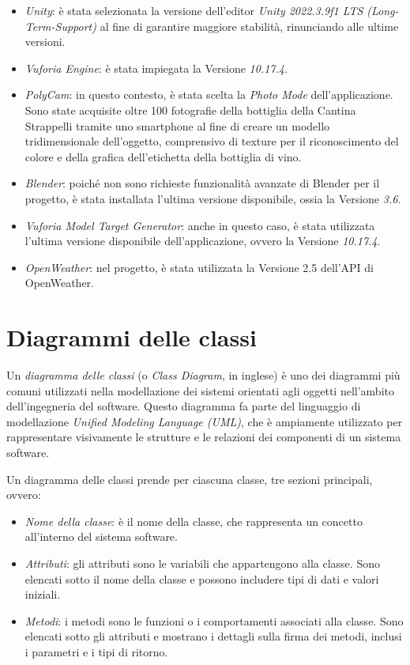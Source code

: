 \begin{itemize}
  \item \textit{Unity}: è stata selezionata la versione dell'editor \textit{Unity 2022.3.9f1 LTS (Long-Term-Support)} al fine di garantire maggiore stabilità, rinunciando alle ultime versioni.
  \item \textit{Vuforia Engine}: è stata impiegata la Versione \textit{10.17.4}.
  \item \textit{PolyCam}: in questo contesto, è stata scelta la \textit{Photo Mode} dell'applicazione. Sono state acquisite oltre 100 fotografie della bottiglia della Cantina Strappelli tramite uno smartphone al fine di creare un modello tridimensionale dell'oggetto, comprensivo di texture per il riconoscimento del colore e della grafica dell'etichetta della bottiglia di vino.
  \item \textit{Blender}: poiché non sono richieste funzionalità avanzate di Blender per il progetto, è stata installata l'ultima versione disponibile, ossia la Versione \textit{3.6}.
  \item \textit{Vuforia Model Target Generator}: anche in questo caso, è stata utilizzata l'ultima versione disponibile dell'applicazione, ovvero la Versione \textit{10.17.4}.
  \item \textit{OpenWeather}: nel progetto, è stata utilizzata la Versione 2.5 dell'API di OpenWeather.
\end{itemize}


\section{Diagrammi delle classi}

Un \textit{diagramma delle classi} (o \textit{Class Diagram}, in inglese) è uno dei diagrammi più comuni utilizzati nella modellazione dei sistemi orientati agli oggetti nell'ambito dell'ingegneria del software. Questo diagramma fa parte del linguaggio di modellazione \textit{Unified Modeling Language (UML)}, che è ampiamente utilizzato per rappresentare visivamente le strutture e le relazioni dei componenti di un sistema software.

Un diagramma delle classi prende per ciascuna classe, tre sezioni principali, ovvero:

\begin{itemize}
    \item \textit{Nome della classe}: è il nome della classe, che rappresenta un concetto all'interno del sistema software.
    \item \textit{Attributi}: gli attributi sono le variabili che appartengono alla classe. Sono elencati sotto il nome della classe e possono includere tipi di dati e valori iniziali.
    \item \textit{Metodi}: i metodi sono le funzioni o i comportamenti associati alla classe. Sono elencati sotto gli attributi e mostrano i dettagli sulla firma dei metodi, inclusi i parametri e i tipi di ritorno.
\end{itemize}

